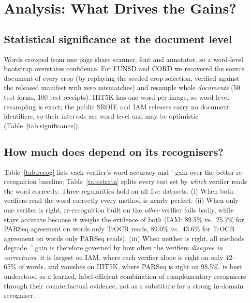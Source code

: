 \section{Analysis: What Drives the Gains?}
\label{sec:analysis}
\subsection{Statistical significance at the document level}
Words cropped from one page share scanner, font and annotator, so a word-level bootstrap overstates confidence. For
FUNSD and CORD we recovered the source document of every crop (by replaying the seeded crop selection, verified against
the released manifest with zero mismatches) and resample whole \emph{documents} (50 test forms, 100 test receipts).
IIIT5K has one word per image, so word-level resampling is exact; the public SROIE and IAM releases carry no document
identifiers, so their intervals are word-level and may be optimistic (Table~\ref{tab:significance}). \SIGSENTENCE

\begin{table}[t]\centering
\caption{\textbf{Paired bootstrap} (2{,}000 resamples) of \ours{} ($k=25$) against the strongest baselines: difference in
AUROC and in macro-F1, 95\% interval and two-sided $p$. Resampling unit: documents for FUNSD and CORD, words otherwise.}
\label{tab:significance}
\footnotesize\setlength{\tabcolsep}{2.5pt}
\end{table}

\subsection{How much does \ours{} depend on its recognisers?}
Table~\ref{tab:recog} lists each verifier's word accuracy and \ours{}' gain over the better re-recognition baseline;
Table~\ref{tab:strata} splits every test set by \emph{which} verifier reads the word correctly. Three regularities hold
on all five datasets. (i) When both verifiers read the word correctly every method is nearly perfect. (ii) When only one
verifier is right, re-recognition built on the \emph{other} verifier fails badly, while \ours{} stays accurate because it
weighs the evidence of both (IAM: 89.5\% vs.\ 25.7\% for PARSeq agreement on words only TrOCR reads, 89.0\% vs.\ 43.6\% for
TrOCR agreement on words only PARSeq reads). (iii) When neither is right, all methods degrade. \ours{}' gain is therefore
governed by how often the verifiers \emph{disagree in correctness}: it is largest on IAM, where each verifier alone is
right on only 42--65\% of words, and vanishes on IIIT5K, where PARSeq is right on 98.5\%. \ours{} is best understood as a
learned, label-efficient combination of complementary recognisers through their counterfactual evidence, not as a
substitute for a strong in-domain recogniser.

